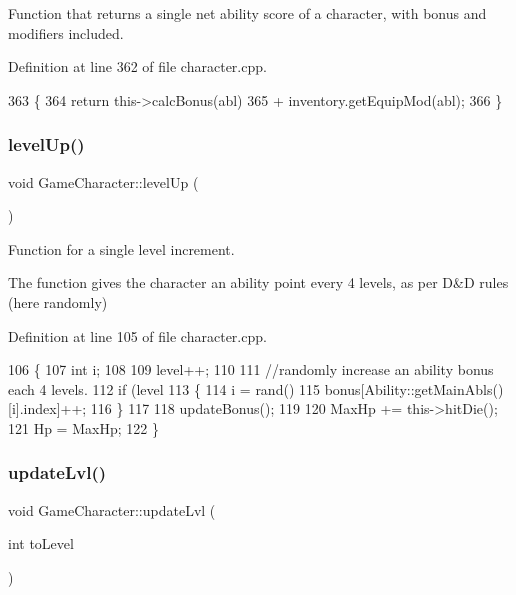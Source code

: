 Function that returns a single net ability score of a character, with bonus and modifiers included. 

Definition at line 362 of file character.\+cpp.


\begin{DoxyCode}
363 \{
364     \textcolor{keywordflow}{return} this->calcBonus(abl)
365         + inventory.getEquipMod(abl);
366 \}
\end{DoxyCode}
\hypertarget{class_game_character_a367a537148a995677d9649b975cb326b}{}\label{class_game_character_a367a537148a995677d9649b975cb326b} 
\subsubsection{\texorpdfstring{level\+Up()}{levelUp()}}
{\footnotesize\ttfamily void Game\+Character\+::level\+Up (\begin{DoxyParamCaption}{ }\end{DoxyParamCaption})}



Function for a single level increment. 

The function gives the character an ability point every 4 levels, as per D\&D rules (here randomly) 

Definition at line 105 of file character.\+cpp.


\begin{DoxyCode}
106 \{
107     \textcolor{keywordtype}{int} i;
108 
109     level++;
110 
111     \textcolor{comment}{//randomly increase an ability bonus each 4 levels.}
112     \textcolor{keywordflow}{if} (level %
113     \{
114         i = rand() %
115         bonus[Ability::getMainAbls()[i].index]++;
116     \}
117 
118     updateBonus();
119 
120     MaxHp += this->hitDie();
121     Hp = MaxHp;
122 \}
\end{DoxyCode}
\hypertarget{class_game_character_a0e6839e7c79e97ba7daea9ed0fc2569e}{}\label{class_game_character_a0e6839e7c79e97ba7daea9ed0fc2569e} 
\subsubsection{\texorpdfstring{update\+Lvl()}{updateLvl()}}
{\footnotesize\ttfamily void Game\+Character\+::update\+Lvl (\begin{DoxyParamCaption}\item[{int}]{to\+Level }\end{DoxyParamCaption})\hspace{0.3cm}{\ttfamily [virtual]}}



